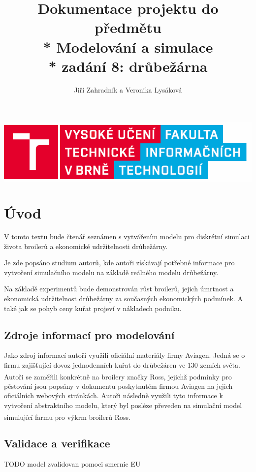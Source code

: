 \documentclass[a4paper,10pt]{article}
\title{Dokumentace projektu do předmětu \\* Modelování a simulace\\* zadání 8: drůbežárna}
\author{Jiří Zahradník a Veronika Lysáková}
\date{}
\begin{document}
\maketitle
\includegraphics[scale=0.5]{fitnewb.png}
\pagebreak

\renewcommand{\contentsname}{Obsah}
\tableofcontents
\pagebreak

%
%

\section{Úvod}
V tomto textu bude čtenář seznámen s vytvářením modelu pro diskrétní simulaci 
života broilerů a ekonomické udržitelnosti drůbežárny.
\par 
Je zde popsáno studium autorů, kde autoři získávají potřebné informace
pro vytvoření simulačního modelu na základě reálného modelu drůbežárny.
\par
Na základě experimentů bude demonstrován růst broilerů, jejich úmrtnost
a ekonomická udržitelnost drůbežárny za současných ekonomických podmínek.
A také jak se pohyb ceny kuřat projeví v nákladech podniku. 
\subsection{Zdroje informací pro modelování}
Jako zdroj informací autoři využili oficiální materiály firmy Aviagen\cite{aviagen}.
Jedná se o firmu zajišťující dovoz jednodenních kuřat do drůbežáren ve 130 zemích světa.
Autoři se zaměřili konkrétně na broilery značky Ross\textsuperscript{\textregistered},
jejichž podmínky pro pěstování jsou popsány v dokumentu poskytnutém firmou Aviagen\cite{ross}
na jejich oficiálních webových stránkách. Autoři následně využili tyto informace k
vytvoření abstraktního modelu\cite{abstract_model}, který byl posléze převeden na simulační model\cite{simulation_model}
simulující farmu pro výkrm broilerů Ross\textsuperscript{\textregistered}. 
\subsection{Validace a verifikace}
TODO model zvalidovan pomoci smernic EU
\end{document}
